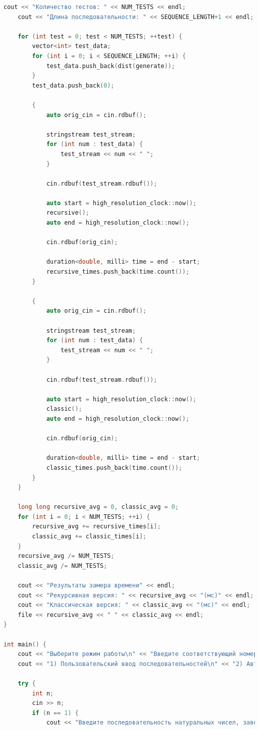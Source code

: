 \documentclass[14pt]{article}
\begin{document}
\begin{flushleft}
\begin{lstlisting}[label = list1, caption = Программная реализация, language=C++, xleftmargin=0pt, xrightmargin=0pt]
	cout << "Количество тестов: " << NUM_TESTS << endl;
	cout << "Длина последовательности: " << SEQUENCE_LENGTH+1 << endl;
	
	for (int test = 0; test < NUM_TESTS; ++test) {
		vector<int> test_data;
		for (int i = 0; i < SEQUENCE_LENGTH; ++i) {
			test_data.push_back(dist(generate));
		}
		test_data.push_back(0);
		
		{
			auto orig_cin = cin.rdbuf();
			
			stringstream test_stream;
			for (int num : test_data) {
				test_stream << num << " ";
			}
			
			cin.rdbuf(test_stream.rdbuf());
			
			auto start = high_resolution_clock::now();
			recursive();
			auto end = high_resolution_clock::now();
			
			cin.rdbuf(orig_cin);
			
			duration<double, milli> time = end - start;
			recursive_times.push_back(time.count());
		}
		
		{
			auto orig_cin = cin.rdbuf();
			
			stringstream test_stream;
			for (int num : test_data) {
				test_stream << num << " ";
			}
			
			cin.rdbuf(test_stream.rdbuf());
			
			auto start = high_resolution_clock::now();
			classic();
			auto end = high_resolution_clock::now();
			
			cin.rdbuf(orig_cin);
			
			duration<double, milli> time = end - start;
			classic_times.push_back(time.count());
		}
	}
	
	long long recursive_avg = 0, classic_avg = 0;
	for (int i = 0; i < NUM_TESTS; ++i) {
		recursive_avg += recursive_times[i];
		classic_avg += classic_times[i];
	}
	recursive_avg /= NUM_TESTS;
	classic_avg /= NUM_TESTS;
	
	cout << "Результаты замера времени" << endl;
	cout << "Рекурсивная версия: " << recursive_avg << "(мс)" << endl;
	cout << "Классическая версия: " << classic_avg << "(мс)" << endl;
	file << recursive_avg << " " << classic_avg << endl;
}

int main() {
	cout << "Выберите режим работы\n" << "Введите соответствующий номер" << endl;
	cout << "1) Пользовательский ввод последовательностей\n" << "2) Автоматический массированный замер времени работы алгоритмов" << endl;
	
	try {
		int n;
		cin >> n;
		if (n == 1) {
			cout << "Введите последовательность натуральных чисел, завершающуюся 0" << endl;
			

\end{lstlisting}
\end{flushleft}
\end{document}
